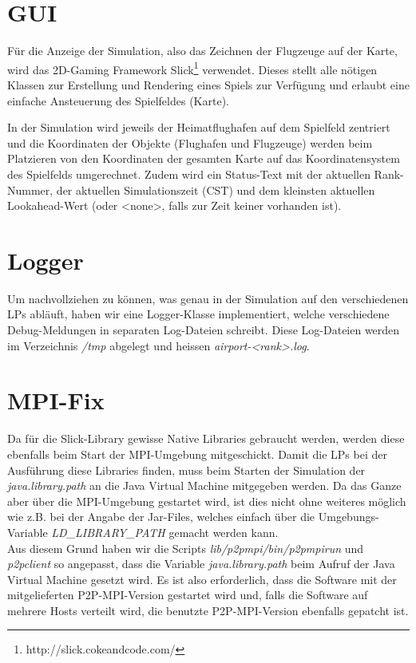\documentclass[oneside,DIV12,BCOR0.5cm,bibliography=totoc]{template}
\begin{document}
\begin{empfile}
\section{GUI}

Für die Anzeige der Simulation, also das Zeichnen der Flugzeuge auf der
Karte, wird das 2D-Gaming Framework
Slick\footnote{http://slick.cokeandcode.com/} verwendet. Dieses stellt
alle nötigen Klassen zur Erstellung und Rendering eines Spiels zur
Verfügung und erlaubt eine einfache Ansteuerung des Spielfeldes (Karte).

In der Simulation wird jeweils der Heimatflughafen auf dem Spielfeld
zentriert und die Koordinaten der Objekte (Flughafen und Flugzeuge)
werden beim Platzieren von den Koordinaten der gesamten Karte auf
das Koordinatensystem des Spielfelds umgerechnet. Zudem wird ein 
Status-Text mit der aktuellen Rank-Nummer, der aktuellen
Simulationszeit (CST) und dem kleinsten aktuellen Lookahead-Wert (oder
<none>, falls zur Zeit keiner vorhanden ist). 

\section{Logger}

Um nachvollziehen zu können, was genau in der Simulation auf den
verschiedenen LPs abläuft, haben wir eine Logger-Klasse implementiert,
welche verschiedene Debug-Meldungen in separaten Log-Dateien
schreibt. Diese Log-Dateien werden im Verzeichnis \emph{/tmp} abgelegt
und heissen \emph{airport-<rank>.log}.

\section{MPI-Fix}

Da für die Slick-Library gewisse Native Libraries gebraucht werden,
werden diese ebenfalls beim Start der MPI-Umgebung mitgeschickt. Damit
die LPs bei der Ausführung diese Libraries finden, muss beim Starten
der Simulation der \emph{java.library.path} an die Java Virtual
Machine mitgegeben werden. Da das Ganze aber über die MPI-Umgebung
gestartet wird, ist dies nicht ohne weiteres möglich wie z.B. bei
der Angabe der Jar-Files, welches einfach über die Umgebungs-Variable
\emph{LD\_LIBRARY\_PATH} gemacht werden kann.\\

Aus diesem Grund haben wir die Scripts \emph{lib/p2pmpi/bin/p2pmpirun}
und \emph{p2pclient} so angepasst, dass die Variable
\emph{java.library.path} beim Aufruf der Java Virtual Machine gesetzt
wird. Es ist also erforderlich, dass die Software mit der mitgelieferten
P2P-MPI-Version gestartet wird und, falls die Software auf mehrere
Hosts verteilt wird, die benutzte P2P-MPI-Version ebenfalls gepatcht
ist.

\end{empfile}
\end{document}
